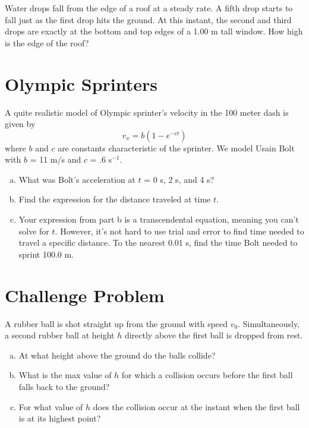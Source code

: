 \documentclass[11pt]{article}
\begin{document}
Water drops fall from the edge of a roof at a steady rate. A fifth drop starts to fall just as the first drop hits the ground. At this instant, the second and third drops are exactly at the bottom and top edges of a 1.00 m tall window. How high is the edge of the roof?


\section{Olympic Sprinters}

A quite realistic model of Olympic sprinter's velocity in the 100 meter dash is given by 
$$ v_x = b(1-e^{-ct}) $$
where $b$ and $c$ are constants characteristic of the sprinter. We model Usain Bolt with $b$ = 11 m/s and $c$ = .6 s$^{-1}$.

\begin{enumerate}[(a)]
	\item What was Bolt's acceleration at $t$ = 0 s, 2 s, and 4 s?
	\vspace{-1mm}
	\item Find the expression for the distance traveled at time $t$.
	\vspace{-1mm}
	\item Your expression from part b is a transcendental equation, meaning you can't solve for $t$. However, it's not hard to use trial and error to find time needed to travel a specific distance. To the nearest 0.01 s, find the time Bolt needed to sprint 100.0 m. 
\end{enumerate}


\section{Challenge Problem}

A rubber ball is shot straight up from the ground with speed $v_0$. Simultaneously, a second rubber ball at height $h$ directly above the first ball is dropped from rest. 

\begin{enumerate}[(a)]
	\item At what height above the ground do the balls collide?
	\vspace{-1mm}
	\item What is the max value of $h$ for which a collision occurs before the first ball falls back to the ground?
	\vspace{-1mm}
	\item For what value of $h$ does the collision occur at the instant when the first ball is at its highest point? 
\end{enumerate}
\end{document}
